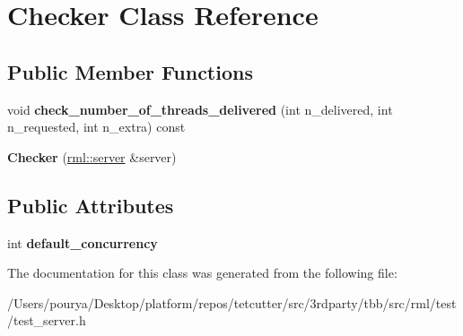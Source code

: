 \hypertarget{classChecker}{}\section{Checker Class Reference}
\label{classChecker}
\subsection*{Public Member Functions}
\begin{DoxyCompactItemize}
\item 
\hypertarget{classChecker_ab9585d5962da10af7ee58b0beb45d394}{}void {\bfseries check\+\_\+number\+\_\+of\+\_\+threads\+\_\+delivered} (int n\+\_\+delivered, int n\+\_\+requested, int n\+\_\+extra) const \label{classChecker_ab9585d5962da10af7ee58b0beb45d394}

\item 
\hypertarget{classChecker_a2cca44c79f833e678734fe3e390a68b2}{}{\bfseries Checker} (\hyperlink{classrml_1_1server}{rml\+::server} \&server)\label{classChecker_a2cca44c79f833e678734fe3e390a68b2}

\end{DoxyCompactItemize}
\subsection*{Public Attributes}
\begin{DoxyCompactItemize}
\item 
\hypertarget{classChecker_ab760636ae13b430d0b6e2ffa5718e5bf}{}int {\bfseries default\+\_\+concurrency}\label{classChecker_ab760636ae13b430d0b6e2ffa5718e5bf}

\end{DoxyCompactItemize}


The documentation for this class was generated from the following file\+:\begin{DoxyCompactItemize}
\item 
/\+Users/pourya/\+Desktop/platform/repos/tetcutter/src/3rdparty/tbb/src/rml/test/test\+\_\+server.\+h\end{DoxyCompactItemize}
